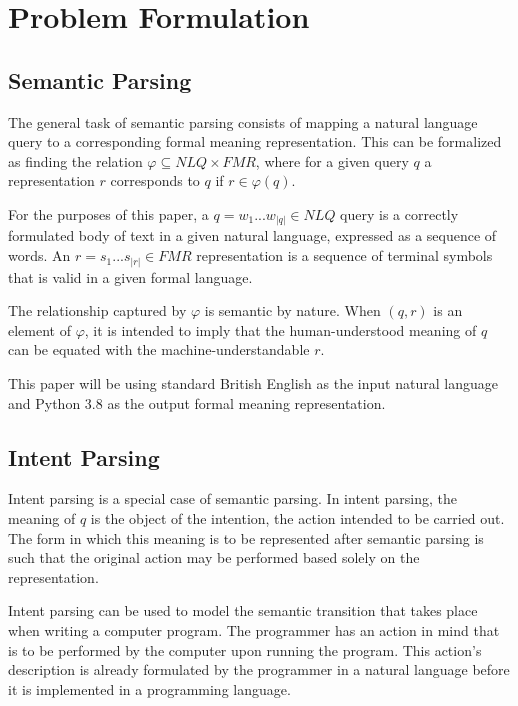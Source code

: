 \documentclass[12pt]{article}
\begin{document}
\section{Problem Formulation}

\subsection{Semantic Parsing}\label{sec:parsing}

The general task of semantic parsing consists of mapping a natural language query to a corresponding formal meaning representation. This can be formalized as finding the relation $\varphi \subseteq NLQ \times FMR$, where for a given query $q$ a representation $r$ corresponds to $q$ if $r \in \varphi(q)$.

For the purposes of this paper, a $q = w_{1} ... w_{|q|} \in NLQ$ query is a correctly formulated body of text in a given natural language, expressed as a sequence of words. An $r = s_{1} ... s_{|r|} \in FMR$ representation is a sequence of terminal symbols that is valid in a given formal language.

The relationship captured by $\varphi$ is semantic by nature. When $(q, r)$ is an element of $\varphi$, it is intended to imply that the human-understood meaning of $q$ can be equated with the machine-understandable $r$.

This paper will be using standard British English as the input natural language and Python 3.8 as the output formal meaning representation.

\subsection{Intent Parsing}

Intent parsing is a special case of semantic parsing. In intent parsing, the meaning of $q$ is the object of the intention, the action intended to be carried out. The form in which this meaning is to be represented after semantic parsing is such that the original action may be performed based solely on the representation.

Intent parsing can be used to model the semantic transition that takes place when writing a computer program. The programmer has an action in mind that is to be performed by the computer upon running the program. This action's description is already formulated by the programmer in a natural language before it is implemented in a programming language.
\end{document}
